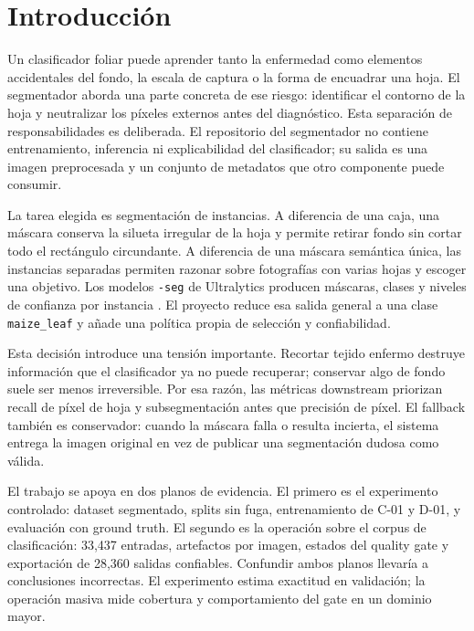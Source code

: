 \documentclass[11pt,a4paper]{article}
\begin{document}
\clearpage\tableofcontents\clearpage\listoffigures\clearpage\listoftables\clearpage
{}
\section{Introducción}

Un clasificador foliar puede aprender tanto la enfermedad como elementos accidentales del fondo, la escala de captura o la forma de encuadrar una hoja. El segmentador aborda una parte concreta de ese riesgo: identificar el contorno de la hoja y neutralizar los píxeles externos antes del diagnóstico. Esta separación de responsabilidades es deliberada. El repositorio del segmentador no contiene entrenamiento, inferencia ni explicabilidad del clasificador; su salida es una imagen preprocesada y un conjunto de metadatos que otro componente puede consumir.


La tarea elegida es segmentación de instancias. A diferencia de una caja, una máscara conserva la silueta irregular de la hoja y permite retirar fondo sin cortar todo el rectángulo circundante. A diferencia de una máscara semántica única, las instancias separadas permiten razonar sobre fotografías con varias hojas y escoger una objetivo. Los modelos \texttt{-seg} de Ultralytics producen máscaras, clases y niveles de confianza por instancia \citep{ultralytics2026segment}. El proyecto reduce esa salida general a una clase \texttt{maize\_leaf} y añade una política propia de selección y confiabilidad.


Esta decisión introduce una tensión importante. Recortar tejido enfermo destruye información que el clasificador ya no puede recuperar; conservar algo de fondo suele ser menos irreversible. Por esa razón, las métricas downstream priorizan recall de píxel de hoja y subsegmentación antes que precisión de píxel. El fallback también es conservador: cuando la máscara falla o resulta incierta, el sistema entrega la imagen original en vez de publicar una segmentación dudosa como válida.


El trabajo se apoya en dos planos de evidencia. El primero es el experimento controlado: dataset segmentado, splits sin fuga, entrenamiento de C-01 y D-01, y evaluación con ground truth. El segundo es la operación sobre el corpus de clasificación: 33,437 entradas, artefactos por imagen, estados del quality gate y exportación de 28,360 salidas confiables. Confundir ambos planos llevaría a conclusiones incorrectas. El experimento estima exactitud en validación; la operación masiva mide cobertura y comportamiento del gate en un dominio mayor.
\end{document}
